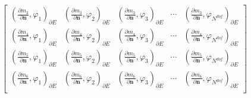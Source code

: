 \begin{equation*}
\begin{aligned}
\begin{bmatrix}
(\frac{\partial m_{3}}{\partial \mathbf n}, \varphi_1)_{\partial E} & (\frac{\partial m_{3}}{\partial \mathbf n}, \varphi_2)_{\partial E} & (\frac{\partial m_{3}}{\partial \mathbf n}, \varphi_3)_{\partial E} & \cdots & (\frac{\partial m_{3}}{\partial \mathbf n}, \varphi_{N^{dof}})_{\partial E}\\
(\frac{\partial m_{4}}{\partial \mathbf n}, \varphi_1)_{\partial E} & (\frac{\partial m_{4}}{\partial \mathbf n}, \varphi_2)_{\partial E} & (\frac{\partial m_{4}}{\partial \mathbf n}, \varphi_3)_{\partial E} & \cdots & (\frac{\partial m_{4}}{\partial \mathbf n}, \varphi_{N^{dof}})_{\partial E}\\
(\frac{\partial m_{5}}{\partial \mathbf n}, \varphi_1)_{\partial E} & (\frac{\partial m_{5}}{\partial \mathbf n}, \varphi_2)_{\partial E} & (\frac{\partial m_{5}}{\partial \mathbf n}, \varphi_3)_{\partial E} & \cdots & (\frac{\partial m_{5}}{\partial \mathbf n}, \varphi_{N^{dof}})_{\partial E}\\
(\frac{\partial m_{6}}{\partial \mathbf n}, \varphi_1)_{\partial E} & (\frac{\partial m_{6}}{\partial \mathbf n}, \varphi_2)_{\partial E} & (\frac{\partial m_{6}}{\partial \mathbf n}, \varphi_3)_{\partial E} & \cdots & (\frac{\partial m_{6}}{\partial \mathbf n}, \varphi_{N^{dof}})_{\partial E}\\
\end{bmatrix}\\
\end{aligned}
\end{equation*}
